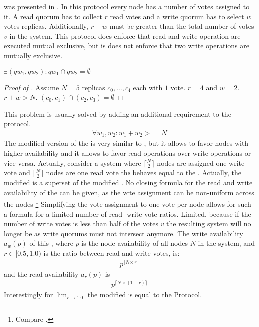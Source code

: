 \documentclass[conference]{IEEEtran}
\begin{document}
 was presented in \cite{Gif79:wvr}.
In this protocol every node has a number of votes assigned to it.
A read quorum has to collect \(r\) read votes and a write quorum has to select
\(w\) votes replicas.
Additionally, \(r + w\) must be greater than the total number of votes \(v\)
in the system.
This protocol does enforce that read and write operation are executed mutual
exclusive, but is does not enforce that two write operations are mutually
exclusive.
\begin{theorem}
\label{thm:weightedemptyintersect}
	\(\exists (qw_1,qw_2) : qw_1 \cap qw_2 = \emptyset\)
\end{theorem}
\begin{proof}[Proof of ]
	Assume \(N = 5\) replicas \(c_0, \dots, c_4\) each with \(1\) vote.
	\(r = 4\) and \(w = 2\).
	\(r + w > N\).
	\((c_0,c_1) \cap (c_2,c_3) = \emptyset\)
\end{proof}
This problem is usually solved by adding an additional requirement to the
protocol.
\begin{align}
	\forall w_1, w_2 : w_1 + w_2 >= N
\end{align}
The modified version of the  is very similar to , but it allows
to favor nodes with higher availability and it allows to favor read operations
over write operations or vice versa.
Actually, consider a system where \(\lceil \frac{N}{2} \rceil\) nodes are
assigned one write vote and \(\lfloor \frac{N}{2} \rfloor\) nodes are one read
vote the  behaves equal to the .
Actually, the modified  is a superset of the modified .
No closing formula for the read and write availability of the  can be
given, as the vote assignment can be non-uniform across the nodes
\footnote{Compare .}
Simplifying the vote assignment to one vote per node allows for such a
formula for a limited number of read- write-vote ratios.
Limited, because if the number of write votes is less than half of the votes
\(v\) the resulting system will no longer be  as write quorums must not
intersect anymore.
The write availability \(a_w(p)\) of this , where \(p\) is the
node availability of all nodes \(N\) in the system, and \(r \in [0.5,1.0)\)
is the ratio between read and write votes, is:
\begin{align}
	p^{\lceil N \times r \rceil}
\end{align}
and the read availability \(a_r(p)\) is
\begin{align}
	p^{\lceil N \times (1 - r) \rceil}
\end{align}
Interestingly for \(\lim_{r\to1.0}\) the modified  is equal to the
 Protocol.
\end{document}
